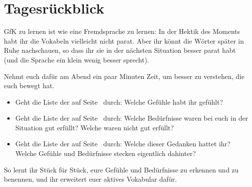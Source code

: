 \section{Tagesrückblick}
\label{tagesrueckblick}

GfK zu lernen ist wie eine Fremdsprache zu lernen: In der Hektik des Moments habt ihr die Vokabeln vielleicht nicht parat. Aber ihr könnt die Wörter später in Ruhe nachschauen, so dass ihr sie in der nächsten Situation besser parat habt (und die Sprache ein klein wenig besser sprecht).

Nehmt euch dafür am Abend ein paar Minuten Zeit, um  besser zu verstehen, die euch bewegt hat.

\begin{itemize}
  \item Geht die Liste der  auf Seite~\pageref{gefuehle-liste} durch: Welche Gefühle habt ihr gefühlt?
  \item Geht die Liste der  auf Seite~\pageref{beduerfnisse-liste} durch: Welche Bedürfnisse waren bei euch in der Situation gut erfüllt? Welche waren nicht gut erfüllt?
  \item Geht die Liste der  auf Seite~\pageref{pseudogefuehle} durch: Welche dieser Gedanken hattet ihr? Welche Gefühle und Bedürfnisse stecken eigentlich dahinter?
\end{itemize}

So lernt ihr Stück für Stück, eure Gefühle und Bedürfnisse zu erkennen und zu benennen, und ihr erweitert euer aktives Vokabular dafür.
